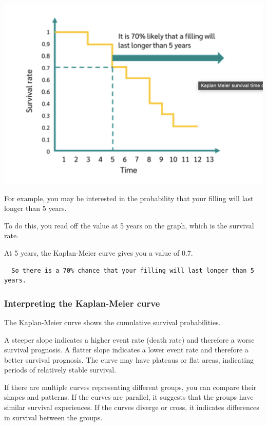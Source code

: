 \documentclass[
]{book}
\begin{document}
\includegraphics{figs/survival2.png}

For example, you may be interested in the probability that your filling will last longer than 5 years.

To do this, you read off the value at 5 years on the graph, which is the survival rate.

At 5 years, the Kaplan-Meier curve gives you a value of 0.7.

\begin{verbatim}
  So there is a 70% chance that your filling will last longer than 5 years.
\end{verbatim}

\hypertarget{interpreting-the-kaplan-meier-curve}{%
\subsubsection{Interpreting the Kaplan-Meier curve}\label{interpreting-the-kaplan-meier-curve}}

The Kaplan-Meier curve shows the cumulative survival probabilities.

A steeper slope indicates a higher event rate (death rate) and therefore a worse survival prognosis. A flatter slope indicates a lower event rate and therefore a better survival prognosis. The curve may have plateaus or flat areas, indicating periods of relatively stable survival.

If there are multiple curves representing different groups, you can compare their shapes and patterns. If the curves are parallel, it suggests that the groups have similar survival experiences. If the curves diverge or cross, it indicates differences in survival between the groups.
\end{document}
